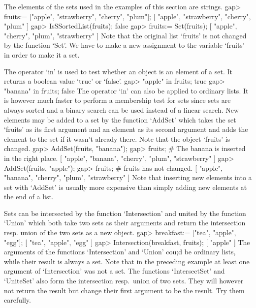 The elements of the sets used in the examples of this section are
strings.
\beginexample
gap> fruits:= ["apple", "strawberry", "cherry", "plum"];
[ "apple", "strawberry", "cherry", "plum" ]
gap> IsSSortedList(fruits);
false
gap> fruits:= Set(fruits);
[ "apple", "cherry", "plum", "strawberry" ] 
\endexample
Note that the original list `fruits' is not changed by the function
`Set'.  We have to make a new assignment to the variable `fruits' in
order to make it a set.

The operator `in' is  used  to test whether an  object is an element of a
set.  It returns a boolean value `true' or `false'.
\beginexample
gap> "apple" in fruits;
true
gap> "banana" in fruits;
false 
\endexample
The operator `in' can also be applied to ordinary lists. It is however
much  faster  to perform  a  membership test for   sets since sets are
always  sorted and a  binary search  can be  used  instead of a linear
search.  New elements  may be added to a  set by the function `AddSet'
which takes the  set `fruits' as its first  argument and an element as
its second argument   and adds the element  to  the set  if  it wasn't
already there. Note that the object `fruits' is changed.
\beginexample
gap> AddSet(fruits, "banana");
gap> fruits;  #  The banana is inserted in the right place.
[ "apple", "banana", "cherry", "plum", "strawberry" ]
gap> AddSet(fruits, "apple");
gap> fruits;  #  fruits has not changed.
[ "apple", "banana", "cherry", "plum", "strawberry" ] 
\endexample
Note that inserting new elements into a set with `AddSet' is usually more
expensive than simply adding new elements at the end of a list.

Sets can be intersected by the function `Intersection'  and united by the
function `Union' which both take  two sets as their arguments  and return
the intersection resp. union of the two sets as a new object.
\beginexample
gap> breakfast:= ["tea", "apple", "egg"];
[ "tea", "apple", "egg" ]
gap> Intersection(breakfast, fruits);
[ "apple" ] 
\endexample
The  arguments  of the functions  `Intersection'  and `Union' cou;d be
ordinary lists, while their  result is always  a set. Note that in the
preceding  example at least one  argument of  `Intersection' was not a
set.   The functions   `IntersectSet' and  `UniteSet'   also form  the
intersection resp.~union of two sets. They will however not return the
result  but change their  first argument  to be  the result.  Try them
carefully.



